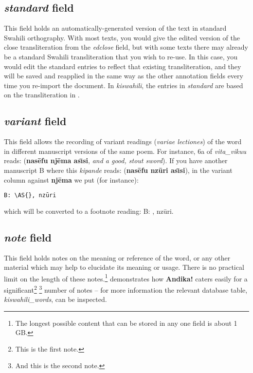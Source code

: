 \subsection{\textit{standard} field}

This field holds an automatically-generated version of the text in standard Swahili orthography.  With most texts, you would give the edited version of the close transliteration from the \textit{edclose} field, but with some texts there may already be a standard Swahili transliteration that you wish to re-use.  In this case, you would edit the standard entries to reflect that existing transliteration, and they will be saved and reapplied in the same way as the other annotation fields every time you re-import the document.  In \textit{kiswahili}, the entries in \textit{standard} are based on the transliteration in \citet{Abdulkadir2013}.


\subsection{\textit{variant} field}

This field allows the recording of variant readings (\textit{variae lectiones}) of the word in different manuscript versions of the same poem.  For instance, 6a of \textit{vita_vikuu} reads:  (\textbf{nasēfu njēma ası̄si}, \textit{and a good, stout sword}).  If you have another manuscript B where this \textit{kipande} reads:  (\textbf{nasēfu nzūri ası̄si}), in the variant column against \textbf{njēma} we put (for instance):

\verb|B: \AS{|\texttt{}\verb|}, nzūri|

which will be converted to a footnote reading: B: , nzūri.


\subsection{\textit{note} field}

This field holds notes on the meaning or reference of the word, or any other material which may help to elucidate its meaning or usage.  There is no practical limit on the length of these notes.\footnote{The longest possible content that can be stored in any one field is about 1 GB.}   demonstrates how \textbf{Andika!} caters easily for a significant\footnote{This is the first note.} \footnote{And this is the second note.}  number of notes -- for more information the relevant database table, \textit{kiswahili_words}, can be inspected.


